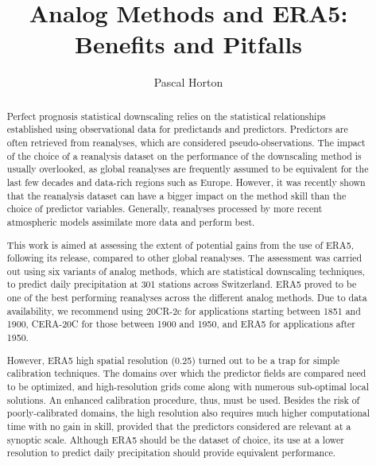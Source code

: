 \documentclass[alpha-refs]{wiley-article}
\title{Analog Methods and ERA5: Benefits and Pitfalls}
\author[1]{Pascal Horton}
\affil[1]{Oeschger Centre for Climate Change Research and Institute of Geography, University of Bern, Bern, Switzerland}
\begin{document}
\maketitle

\begin{abstract}
Perfect prognosis statistical downscaling relies on the statistical relationships established using observational data for predictands and predictors. Predictors are often retrieved from reanalyses, which are considered pseudo-observations. The impact of the choice of a reanalysis dataset on the performance of the downscaling method is usually overlooked, as global reanalyses are frequently assumed to be equivalent for the last few decades and data-rich regions such as Europe. However, it was recently shown that the reanalysis dataset can have a bigger impact on the method skill than the choice of predictor variables. Generally, reanalyses processed by more recent atmospheric models assimilate more data and perform best.

This work is aimed at assessing the extent of potential gains from the use of ERA5, following its release, compared to other global reanalyses. The assessment was carried out using six variants of analog methods, which are statistical downscaling techniques, to predict daily precipitation at 301 stations across Switzerland. ERA5 proved to be one of the best performing reanalyses across the different analog methods. Due to data availability, we recommend using 20CR-2c for applications starting between 1851 and 1900, CERA-20C for those between 1900 and 1950, and ERA5 for applications after 1950.

However, ERA5 high spatial resolution (0.25\degree) turned out to be a trap for simple calibration techniques. The domains over which the predictor fields are compared need to be optimized, and high-resolution grids come along with numerous sub-optimal local solutions. An enhanced calibration procedure, thus, must be used. Besides the risk of poorly-calibrated domains, the high resolution also requires much higher computational time with no gain in skill, provided that the predictors considered are relevant at a synoptic scale. Although ERA5 should be the dataset of choice, its use at a lower resolution to predict daily precipitation should provide equivalent performance.



\end{abstract}
\end{document}
